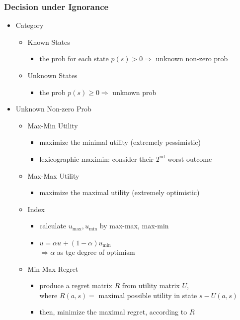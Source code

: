 \subsubsection{Decision under Ignorance}
\begin{itemize}
\item Category
	\begin{itemize}
	\item Known States
		\begin{itemize}
		\item the prob for each state $p(s) > 0 \Rightarrow$ unknown non-zero prob
		\end{itemize}
	\item Unknown States
		\begin{itemize}
		\item the prob $p(s) \ge 0 \Rightarrow$ unknown prob
		\end{itemize}
	\end{itemize}
\item Unknown Non-zero Prob
	\begin{itemize}
	\item Max-Min Utility
		\begin{itemize}
		\item maximize the minimal utility (extremely pessimistic)
		\item lexicographic maximin: consider their $2^\text{nd}$ worst outcome
		\end{itemize}
	\item Max-Max Utility
		\begin{itemize}
		\item maximize the maximal utility (extremely optimistic)
		\end{itemize}
	\item Index
		\begin{itemize}
		\item calculate $u_\text{max}, u_\text{min}$ by max-max, max-min
		\item $u = \alpha u_\text{} + (1-\alpha) u_\text{min}$ \\
		$\Rightarrow \alpha$ as tge degree of optimism
		\end{itemize}
	\item Min-Max Regret
		\begin{itemize}
		\item produce a regret matrix $R$ from utility matrix $U$, \\ 
		where $R(a,s) = $ maximal possible utility in state $s - U(a,s)$
		\item then, minimize the maximal regret, according to $R$

\end{itemize}
\end{itemize}
\end{itemize}

